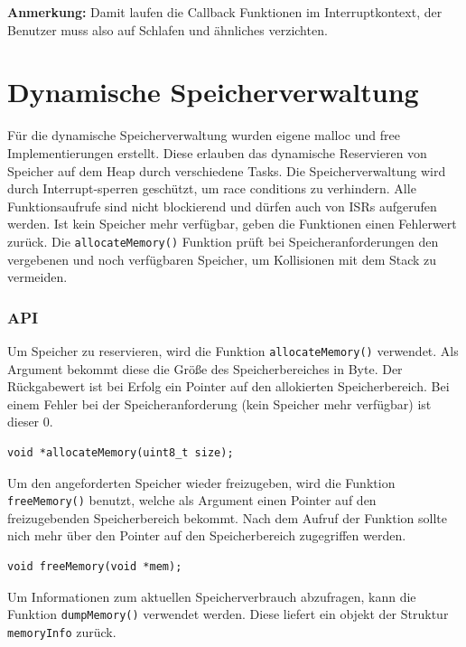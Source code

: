 \documentclass[fontsize=12pt, toc=bibliography, notitlepage]{scrreprt}
\begin{document}
\textbf{Anmerkung:} Damit laufen die Callback Funktionen im Interruptkontext, der Benutzer muss also auf Schlafen und ähnliches verzichten.

\chapter{Dynamische Speicherverwaltung}
\label{chap:dynamische-speicherverwaltung}
Für die dynamische Speicherverwaltung wurden eigene malloc und free Implementierungen erstellt. Diese erlauben das dynamische Reservieren von Speicher auf dem Heap durch verschiedene Tasks. Die Speicherverwaltung wird durch Interrupt-sperren geschützt, um race conditions zu verhindern. Alle Funktionsaufrufe sind nicht blockierend und dürfen auch von ISRs aufgerufen werden. Ist kein Speicher mehr verfügbar, geben die Funktionen einen Fehlerwert zurück. Die \lstinline$allocateMemory()$ Funktion prüft bei Speicheranforderungen den vergebenen und noch verfügbaren Speicher, um Kollisionen mit dem Stack zu vermeiden.

\subsection{API}
\label{subsec:mem-api}
Um Speicher zu reservieren, wird die Funktion \lstinline$allocateMemory()$ verwendet. Als Argument bekommt diese die Größe des Speicherbereiches in Byte. Der Rückgabewert ist bei Erfolg ein Pointer auf den allokierten Speicherbereich. Bei einem Fehler bei der Speicheranforderung (kein Speicher mehr verfügbar) ist dieser 0.

\begin{lstlisting}[title=memory.h]
void *allocateMemory(uint8_t size);
\end{lstlisting}

Um den angeforderten Speicher wieder freizugeben, wird die Funktion \lstinline$freeMemory()$ benutzt, welche als Argument einen Pointer auf den freizugebenden  Speicherbereich bekommt. Nach dem Aufruf der Funktion sollte nich mehr über den Pointer auf den Speicherbereich zugegriffen werden.

\begin{lstlisting}[title=memory.h]
void freeMemory(void *mem);
\end{lstlisting}

Um Informationen zum aktuellen Speicherverbrauch abzufragen, kann die Funktion \lstinline$dumpMemory()$ verwendet werden. Diese liefert ein objekt der Struktur \lstinline$memoryInfo$ zurück.
\end{document}

